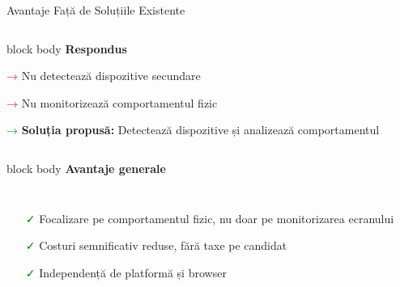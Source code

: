 \documentclass[aspectratio=169,9pt]{beamer}
\begin{document}
\begin{frame}{Avantaje Față de Soluțiile Existente}
\begin{columns}[T]
                        \begin{beamercolorbox}[rounded=true,shadow=true,sep=0.7em]{block body}
                                \centering\textbf{\small Respondus}
                                \vspace{0.1cm}
                                
                                \footnotesize
                                \textcolor{red}{→} Nu detectează dispozitive secundare
                                \vspace{0.1cm}
                                
                                \textcolor{red}{→} Nu monitorizează comportamentul fizic
                                \vspace{0.1cm}
                                
                                \textcolor{green}{→} \textbf{Soluția propusă:} Detectează dispozitive și analizează comportamentul
                        \end{beamercolorbox}
        \end{columns}
        
        \vspace{0.2cm}
        
        \begin{beamercolorbox}[rounded=true,shadow=true,sep=0.7em]{block body}
                \centering\textcolor{mainblue}{\textbf{\small Avantaje generale}}
                \vspace{0.1cm}
                
                \begin{columns}[T]
                                \footnotesize
                                \begin{itemize}[leftmargin=0.5cm,itemsep=0.05cm]
                                        \item[\textcolor{green}{\faCheck}] Focalizare pe comportamentul fizic, nu doar pe monitorizarea ecranului
                                        \item[\textcolor{green}{\faCheck}] Costuri semnificativ reduse, fără taxe pe candidat
                                        \item[\textcolor{green}{\faCheck}] Independență de platformă și browser
                                \end{itemize}
                                

\end{columns}
\end{beamercolorbox}
\end{frame}
\end{document}

